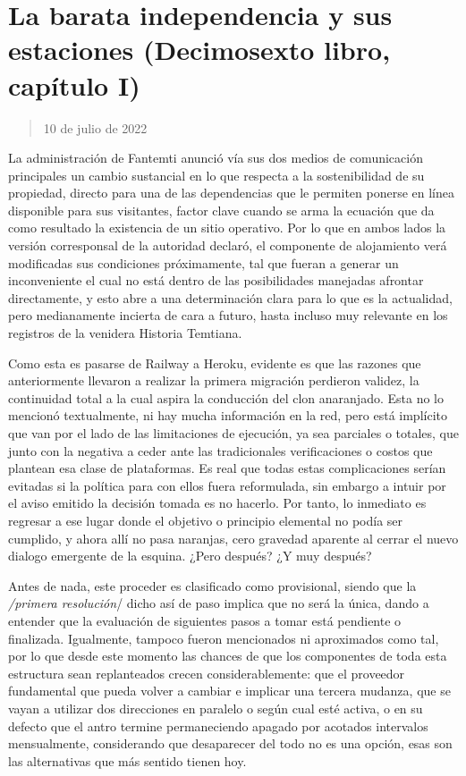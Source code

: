 \documentclass[
]{book}
\begin{document}
\hypertarget{la-barata-independencia-y-sus-estaciones-decimosexto-libro-capuxedtulo-i}{%
\section{La barata independencia y sus estaciones (Decimosexto libro, capítulo I)}\label{la-barata-independencia-y-sus-estaciones-decimosexto-libro-capuxedtulo-i}}

\begin{quote}
10 de julio de 2022
\end{quote}

La administración de Fantemti anunció vía sus dos medios de comunicación principales un cambio sustancial en lo que respecta a la sostenibilidad de su propiedad, directo para una de las dependencias que le permiten ponerse en línea disponible para sus visitantes, factor clave cuando se arma la ecuación que da como resultado la existencia de un sitio operativo. Por lo que en ambos lados la versión corresponsal de la autoridad declaró, el componente de alojamiento verá modificadas sus condiciones próximamente, tal que fueran a generar un inconveniente el cual no está dentro de las posibilidades manejadas afrontar directamente, y esto abre a una determinación clara para lo que es la actualidad, pero medianamente incierta de cara a futuro, hasta incluso muy relevante en los registros de la venidera Historia Temtiana.

Como esta es pasarse de Railway a Heroku, evidente es que las razones que anteriormente llevaron a realizar la primera migración perdieron validez, la continuidad total a la cual aspira la conducción del clon anaranjado. Esta no lo mencionó textualmente, ni hay mucha información en la red, pero está implícito que van por el lado de las limitaciones de ejecución, ya sea parciales o totales, que junto con la negativa a ceder ante las tradicionales verificaciones o costos que plantean esa clase de plataformas. Es real que todas estas complicaciones serían evitadas si la política para con ellos fuera reformulada, sin embargo a intuir por el aviso emitido la decisión tomada es no hacerlo. Por tanto, lo inmediato es regresar a ese lugar donde el objetivo o principio elemental no podía ser cumplido, y ahora allí no pasa naranjas, cero gravedad aparente al cerrar el nuevo dialogo emergente de la esquina. ¿Pero después? ¿Y muy después?

Antes de nada, este proceder es clasificado como provisional, siendo que la \emph{/primera resolución}/ dicho así de paso implica que no será la única, dando a entender que la evaluación de siguientes pasos a tomar está pendiente o finalizada. Igualmente, tampoco fueron mencionados ni aproximados como tal, por lo que desde este momento las chances de que los componentes de toda esta estructura sean replanteados crecen considerablemente: que el proveedor fundamental que pueda volver a cambiar e implicar una tercera mudanza, que se vayan a utilizar dos direcciones en paralelo o según cual esté activa, o en su defecto que el antro termine permaneciendo apagado por acotados intervalos mensualmente, considerando que desaparecer del todo no es una opción, esas son las alternativas que más sentido tienen hoy.
\end{document}
